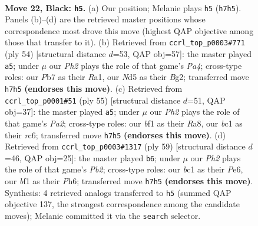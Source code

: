 \documentclass[11pt]{article}
\begin{document}
\clearpage

\begin{figure}[p]\centering
\begin{subfigure}{0.46\textwidth}\centering
\resizebox{\linewidth}{!}{%
\newchessgame
\chessboard[
  setfen={rk3b1r/pp5p/8/2PnpP2/PP5R/8/8/R1B1KB2 b Q - 2 22},
  showmover=false,
  pgfstyle=straightmove, color=movearrow, markmove={h7-h5}
]}
\caption{}
\end{subfigure}\hfill
\begin{subfigure}{0.46\textwidth}\centering
\resizebox{\linewidth}{!}{%
\newchessgame
\chessboard[
  setfen={r5k1/5p1p/1r3p2/8/Pp2p3/6P1/4bPBP/RR4K1 w - - 0 28},
  showmover=false,
  pgfstyle=straightmove, color=movearrow, markmove={a4-a5}
]}
\caption{}
\end{subfigure}
\\[4pt]
\begin{subfigure}{0.46\textwidth}\centering
\resizebox{\linewidth}{!}{%
\newchessgame
\chessboard[
  setfen={r5k1/p2rbpp1/2R5/3p3p/pP1B4/P3P1P1/7P/3R2K1 b - - 2 28},
  showmover=false,
  pgfstyle=straightmove, color=movearrow, markmove={a7-a5}
]}
\caption{}
\end{subfigure}\hfill
\begin{subfigure}{0.46\textwidth}\centering
\resizebox{\linewidth}{!}{%
\newchessgame
\chessboard[
  setfen={8/Rp1rk3/2p1p2p/4P1pP/Pn2B3/6P1/1r3P2/4R1K1 b - - 2 30},
  showmover=false,
  pgfstyle=straightmove, color=movearrow, markmove={b7-b6}
]}
\caption{}
\end{subfigure}
\caption{\textbf{Move 22, Black: \texttt{h5}.} (a) Our position; Melanie plays \texttt{h5} (\texttt{h7h5}). Panels (b)--(d) are the retrieved master positions whose correspondence most drove this move (highest QAP objective among those that transfer to it). (b) Retrieved from \texttt{ccrl\_top\_p0003\#771} (ply 54) [structural distance $d$=53, QAP obj=57]: the master played \texttt{a5}; under $\mu$ our \emph{Ph2} plays the role of that game's \emph{Pa4}; cross-type roles: our \emph{P}b7 as their \emph{R}a1, our \emph{N}d5 as their \emph{B}g2; transferred move \texttt{h7h5} \textbf{(endorses this move)}. (c) Retrieved from \texttt{ccrl\_top\_p0001\#51} (ply 55) [structural distance $d$=51, QAP obj=37]: the master played \texttt{a5}; under $\mu$ our \emph{Ph2} plays the role of that game's \emph{Pa2}; cross-type roles: our \emph{b}f1 as their \emph{R}a8, our \emph{b}c1 as their \emph{r}c6; transferred move \texttt{h7h5} \textbf{(endorses this move)}. (d) Retrieved from \texttt{ccrl\_top\_p0003\#1317} (ply 59) [structural distance $d$=46, QAP obj=25]: the master played \texttt{b6}; under $\mu$ our \emph{Ph2} plays the role of that game's \emph{Pb2}; cross-type roles: our \emph{b}c1 as their \emph{P}e6, our \emph{b}f1 as their \emph{P}h6; transferred move \texttt{h7h5} \textbf{(endorses this move)}. Synthesis: 4 retrieved analogs transferred to \texttt{h5} (summed QAP objective 137, the strongest correspondence among the candidate moves); Melanie committed it via the \texttt{search} selector.}
\label{fig:thought-m43}
\end{figure}
\end{document}
